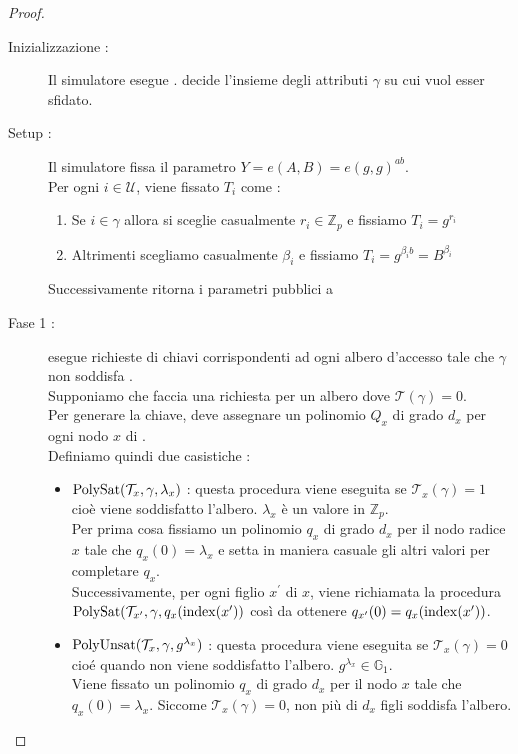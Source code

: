 \begin{thm}
\begin{proof}
\begin{description}
\item[Inizializzazione :] Il simulatore  esegue .  decide l'insieme degli attributi $\gamma$ su cui vuol esser sfidato.
\item[Setup :] Il simulatore  fissa il parametro $Y= e(A,B) = e(g,g)^{ab}$.\\
Per ogni $i \in \mathcal{U}$, viene fissato $T_i$ come :
\begin{enumerate}
\item Se $i \in \gamma$ allora si sceglie casualmente $r_i \in \mathbb{Z}_p$ e fissiamo $T_i = g^{r_i}$
\item Altrimenti scegliamo casualmente $\beta_i$ e fissiamo $T_i = g^{\beta_i b} = B^{\beta_i}$
\end{enumerate}
Successivamente  ritorna i parametri pubblici a 
\item[Fase 1 :]  esegue richieste di chiavi corrispondenti ad ogni albero d'accesso  tale che $\gamma$ non soddisfa .\\
Supponiamo che  faccia una richiesta per un albero  dove $\mathcal{T}(\gamma) = 0$.\\
Per generare la chiave,  deve assegnare un polinomio $Q_x$ di grado $d_x$ per ogni nodo $x$ di .\\
Definiamo quindi due casistiche :
\begin{itemize}
\item $\operatorname{PolySat} (\mathcal{T}_x , \gamma, \lambda_x )$ : questa procedura viene eseguita se $\mathcal{T}_x(\gamma) = 1$ cioè viene soddisfatto l'albero. $\lambda_x$ è un valore in $\mathbb{Z}_p$.\\
Per prima cosa fissiamo un polinomio $q_x$ di grado $d_x$ per il nodo radice $x$ tale che $q_x(0) = \lambda_x$ e setta in maniera casuale gli altri valori per completare $q_x$.\\
Successivamente, per ogni figlio $x^\prime$ di $x$, viene richiamata la procedura $\operatorname{PolySat}(\mathcal{T}_{x^\prime}, \gamma, q_x(\operatorname{index}(x^\prime))$ così da ottenere $q_{x^\prime} (0) = q_x (\operatorname{index}(x^\prime))$.
\item $\operatorname{PolyUnsat}(\mathcal{T}_x, \gamma , g^{\lambda_x})$ : questa procedura viene eseguita se $\mathcal{T}_x (\gamma) = 0$ cioé quando non viene soddisfatto l'albero. $g^{\lambda_x} \in \mathbb{G}_1$.\\
Viene fissato un polinomio $q_x$ di grado $d_x$ per il nodo $x$ tale che $q_x(0) = \lambda_x$. Siccome $\mathcal{T}_x(\gamma) = 0$, non più di $d_x$ figli soddisfa l'albero.\\

\end{itemize}
\end{description}
\end{proof}
\end{thm}
